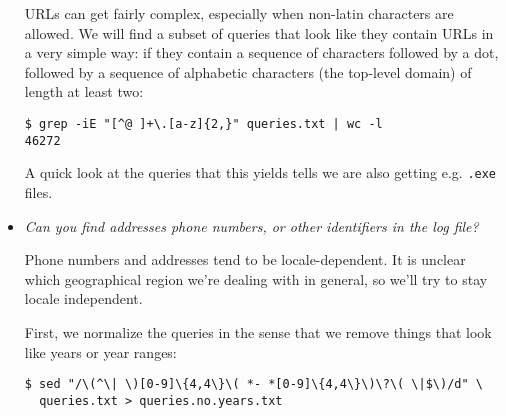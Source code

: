 \begin{itemize}
URLs can get fairly complex, especially when non-latin characters are allowed.
We will find a subset of queries that look like they contain URLs in a very
simple way: if they contain a sequence of characters followed by a dot,
followed by a sequence of alphabetic characters (the top-level domain) of
length at least two:

\begin{lstlisting}
$ grep -iE "[^@ ]+\.[a-z]{2,}" queries.txt | wc -l
46272
\end{lstlisting}

A quick look at the queries that this yields tells we are also getting e.g.
\texttt{.exe} files.






\item \emph{Can you find addresses phone numbers, or other identifiers in the
log file?}

Phone numbers and addresses tend to be locale-dependent. It is unclear which
geographical region we're dealing with in general, so we'll try to stay locale
independent.

First, we normalize the queries in the sense that we remove things that look
like years or year ranges:

\begin{lstlisting}
$ sed "/\(^\| \)[0-9]\{4,4\}\( *- *[0-9]\{4,4\}\)\?\( \|$\)/d" \
  queries.txt > queries.no.years.txt
\end{lstlisting}


\end{itemize}
